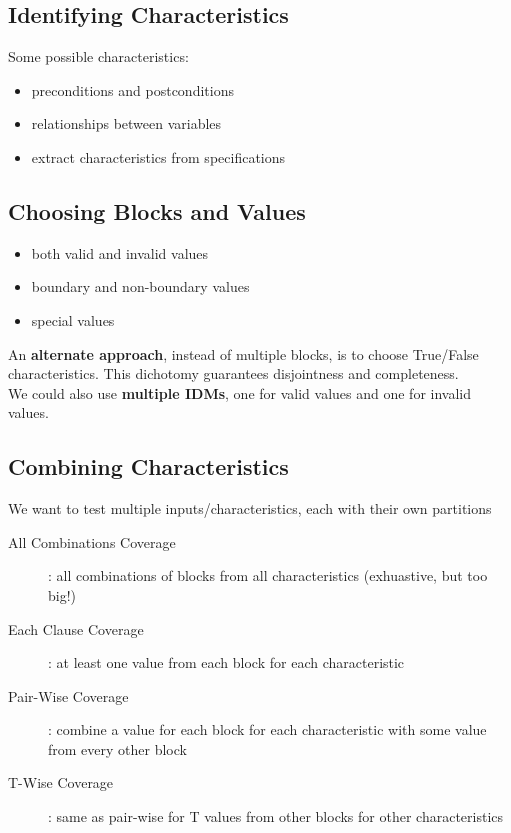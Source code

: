 \documentclass[]{article}
\theoremstyle{definition}
\begin{document}
		\subsection{Identifying Characteristics}
		Some possible characteristics:
		\begin{itemize}
			\item preconditions and postconditions
			\item relationships between variables 
			\item extract characteristics from specifications
		\end{itemize}

		\subsection{Choosing Blocks and Values}
		\begin{itemize}
			\item both valid and invalid values
			\item boundary and non-boundary values
			\item special values
		\end{itemize}
		An \textbf{alternate approach}, instead of multiple blocks, is to choose True/False characteristics.
		This dichotomy guarantees disjointness and completeness. \\
		We could also use \textbf{multiple IDMs}, one for valid values and one for invalid values.

		\subsection{Combining Characteristics}
		We want to test multiple inputs/characteristics, each with their own partitions 
		
		\begin{description}
			\item[All Combinations Coverage]: all combinations of blocks from all characteristics (exhuastive, but too big!)
			\item[Each Clause Coverage]: at least one value from each block for each characteristic
			\item[Pair-Wise Coverage]: combine a value for each block for each characteristic with some value from every other block
			\item[T-Wise Coverage]: same as pair-wise for T values from other blocks for other characteristics
		\end{description}
\end{document}
